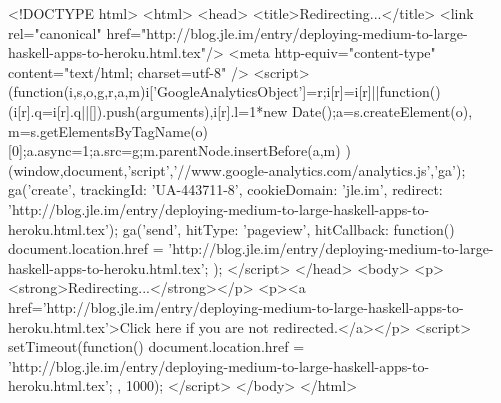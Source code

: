 <!DOCTYPE html>
<html>
<head>
<title>Redirecting...</title>
<link rel="canonical" href="http://blog.jle.im/entry/deploying-medium-to-large-haskell-apps-to-heroku.html.tex"/>
<meta http-equiv="content-type" content="text/html; charset=utf-8" />
<script>
(function(i,s,o,g,r,a,m){i['GoogleAnalyticsObject']=r;i[r]=i[r]||function(){
(i[r].q=i[r].q||[]).push(arguments)},i[r].l=1*new Date();a=s.createElement(o),
m=s.getElementsByTagName(o)[0];a.async=1;a.src=g;m.parentNode.insertBefore(a,m)
})(window,document,'script','//www.google-analytics.com/analytics.js','ga');
ga('create', { trackingId: 'UA-443711-8', cookieDomain: 'jle.im', redirect: 'http://blog.jle.im/entry/deploying-medium-to-large-haskell-apps-to-heroku.html.tex'});
ga('send', { hitType: 'pageview', hitCallback: function() { document.location.href = 'http://blog.jle.im/entry/deploying-medium-to-large-haskell-apps-to-heroku.html.tex'; } });
</script>
</head>
<body>
  <p><strong>Redirecting...</strong></p>
  <p><a href='http://blog.jle.im/entry/deploying-medium-to-large-haskell-apps-to-heroku.html.tex'>Click here if you are not redirected.</a></p>
  <script>
    setTimeout(function() { document.location.href = 'http://blog.jle.im/entry/deploying-medium-to-large-haskell-apps-to-heroku.html.tex'; }, 1000);
  </script>
</body>
</html>
